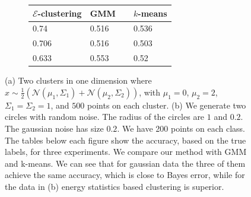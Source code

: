 \documentclass[simplex.tex]{subfiles}
\begin{document}
\begin{figure}[h!]
\begin{cframed}
\begin{subfigure}[t]{0.45\textwidth}
\begin{tabular}{ l l l}
\hline
$\mathcal{E}$-clustering & GMM~~ & $k$-means \\
\hline
0.74 &
0.516 &
0.536 \\
0.706 &
0.516 &
0.503 \\
0.633 &
0.553 &
0.52 \\
\hline
\end{tabular}
\end{subfigure}
\caption{
(a) Two clusters in one dimension where
$x \sim \tfrac{1}{2}\left( \mathcal{N}(\mu_1, \Sigma_1) +
\mathcal{N}(\mu_2, \Sigma_2)\right)$, with $\mu_1 = 0$, $\mu_2=2$,
$\Sigma_1 = \Sigma_2 = 1$,
and $500$ points on each cluster. 
(b) We generate two circles with random noise.
The radius of the circles are $1$ and $0.2$. The gaussian noise has size $0.2$.
We have 200 points on each class. The tables below each figure show
the accuracy, based on the true labels, for three experiments.
We compare our method with GMM and k-means. We can see that for gaussian
data the three of them achieve the same accuracy, which is close to Bayes
error, while for the data in
(b) energy statistics based clustering is superior.
}
\label{fig:nonpar}
\end{cframed}
\end{figure}
\clearpage
\end{document}
